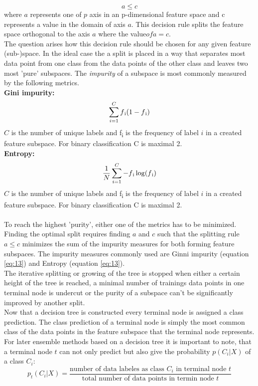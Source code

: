 \begin{equation} \label{eq:12}
a \leq c
\end{equation}
where $a$ represents one of $p$ axis in an p-dimensional feature space and c represents a value in the domain of axis $a$.
This decision rule splits the feature space orthogonal to the axis $a$ where the value$ of a = c$.
\\
The question arises how this decision rule should be chosen for any given feature (sub-)space.
In the ideal case the a split is placed in a way that separates most data point from one class from the data points of the other class and leaves two most 'pure' subspaces. The \emph{impurity} of a subspace is most commonly measured by the following metrics. 
\\
\textbf{Gini impurity:}  \\
\begin{equation} \label{eq:13}
\sum_{i=1}^{C} f\textsubscript{i}(1-f\textsubscript{i})
\end{equation}
$C$ is the number of unique labels and f\textsubscript{i} is the frequency of label $i$ in a created feature subspace. For binary classification C is maximal 2.\\
\textbf{Entropy:}
\begin{equation} \label{eq:14}
\frac{1}{N}\sum_{i=1}^{C} -f\textsubscript{i}\log(f\textsubscript{i})
\end{equation}
$C$ is the number of unique labels and f\textsubscript{i} is the frequency of label $i$ in a created feature subspace. For binary classification C is maximal 2. \\
\\
To reach the highest 'purity', either one of the metrics has to be minimized. \\
Finding the optimal split requires finding $a$ and $c$ such that the splitting rule  $a \leq c$ minimizes the sum of the impurity measures for both forming feature subspaces. The impurity measures commonly used are Ginni impurity (equation \ref{eq:13}) and Entropy (equation \ref{eq:13}). 
\\
The iterative splitting or growing of the tree is stopped when either a certain height of the tree is reached, a minimal number of trainings data points in one terminal node is undercut or the purity of a subspace can't be significantly improved by another split.
\\

Now that a decision tree is constructed every terminal node is assigned a class prediction. The class prediction of a terminal node is simply the most common class of the data points in the feature subspace that the terminal node represents. For later ensemble methods based on a decision tree it is important to note, that a terminal node $t$ can not only predict but also give the probability $p(C_i|X)$ of a class $C_i$:
\begin{equation} \label{eq:20}
p_t(C_i|X)=\frac{\text{number of data labeles as class }C_i\text{ in terminal node }t}{\text{total number of data points in termin node }t}
\end{equation}
\\

